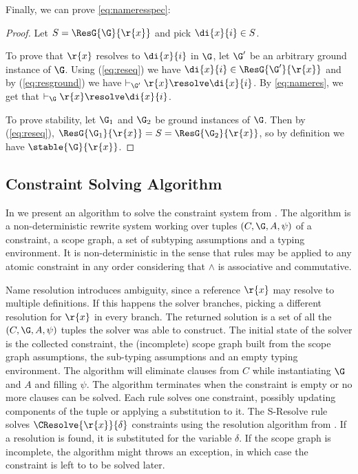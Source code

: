 Finally, we can prove \ref{eq:nameresspec}:
\begin{proof}
Let $S = \ResG{\G}{\r{x}}$ and pick $\di{x}{i} \in S$.

To prove that $\r{x}$ resolves to $\di{x}{i}$ in $\G$, let $\G'$ be an arbitrary ground instance of $\G$.  
Using (\ref{eq:reseq}) we have $\di{x}{i} \in \ResG{\G'}{\r{x}}$ and by (\ref{eq:resground}) we have
$\vdash_{\G'} \r{x} \resolve \di{x}{i}$. By \ref{eq:nameres}, 
we get that $\vdash_\G \r{x} \resolve \di{x}{i}$.

To prove stability, let $\G_1$ and $\G_2$ be ground instances of $\G$. Then by (\ref{eq:reseq}), $\ResG{\G_1}{\r{x}} = S = \ResG{\G_2}{\r{x}}$, so by definition we have $\stable{\G}{\r{x}}$.
\end{proof}

\subsection{Constraint Solving Algorithm}
\newcommand{\alabl}[1]{\textsc{(#1)}}
\newcommand{\leqa}{A}


In  we present an algorithm to solve the
constraint system from . The algorithm is a
non-deterministic rewrite system working over tuples $(C,\G,\leqa,\psi)$ of a
constraint, a scope graph, a set of subtyping assumptions and a typing
environment. It is non-deterministic in the sense that rules may be
applied to any atomic constraint in any order considering that 
$\wedge$ is associative and commutative. 

Name resolution introduces ambiguity, since a reference $\r{x}$ may
resolve to multiple definitions. If this happens the solver branches,
picking a different resolution for $\r{x}$ in every branch. The
returned solution is a set of all the $(C,\G,\leqa,\psi)$ tuples the
solver was able to construct.
The initial state of the solver is the collected constraint, the
(incomplete) scope graph built from the scope graph assumptions, 
the sub-typing assumptions
and an empty typing environment. The algorithm will eliminate clauses
from $C$ while instantiating $\G$ and $\leqa$ and filling $\psi$. The
algorithm terminates when the constraint is empty or no more clauses
can be solved. 
Each rule solves one constraint, possibly updating components of
the tuple or applying a substitution to it. The {\sc S-Resolve} rule
solves $\CResolve{\r{x}}{\delta}$ constraints using the resolution
algorithm from . If a resolution is found, it
is substituted for the variable $\delta$. If the scope graph is
incomplete, the algorithm might throws an exception, in which case the
constraint is left to to be solved later.


